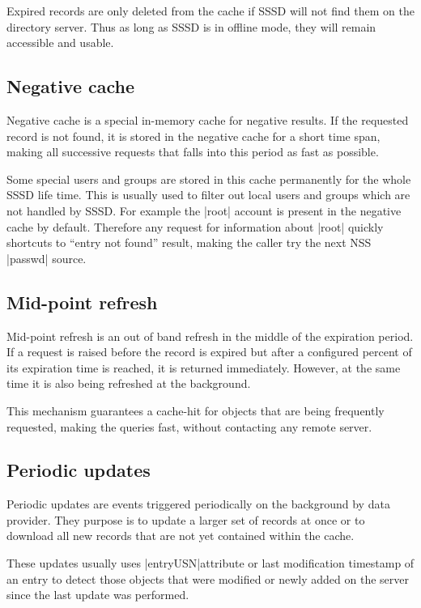 Expired records are only deleted from the cache if SSSD will not find them on
the directory server. Thus as long as SSSD is in offline mode, they will remain
accessible and usable.

\subsection{Negative cache}
\label{sssd:cache:negative}

Negative cache is a special in-memory cache for negative results. If the
requested record is not found, it is stored in the negative cache for a short
time span, making all successive requests that falls into this period as fast
as possible.

Some special users and groups are stored in this cache permanently for the whole
SSSD life time. This is usually used to filter out local users and groups which
are not handled by SSSD. For example the |root| account is present in the
negative cache by default. Therefore any request for information about |root|
quickly shortcuts to ``entry not found'' result, making the caller try the next
NSS |passwd| source.

\subsection{Mid-point refresh}
\label{sssd:cache:midpoint}

Mid-point refresh is an out of band refresh in the middle of the expiration
period. If a request is raised before the record is expired but after a
configured percent of its expiration time is reached, it is returned
immediately. However, at the same time it is also being refreshed at the
background.

This mechanism guarantees a cache-hit for objects that are being frequently
requested, making the queries fast, without contacting any remote server.

\subsection{Periodic updates}
\label{sssd:cache:periodic}

Periodic updates are events triggered periodically on the background by data
provider. They purpose is to update a larger set of records at once or to
download all new records that are not yet contained within the cache.

These updates usually uses |entryUSN|\footnotemark attribute or last modification
timestamp of an entry to detect those objects that were modified or newly added
on the server since the last update was performed.

